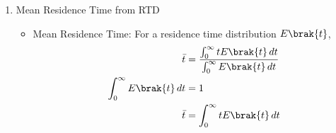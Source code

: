 \begin{enumerate}[label=\thesubsection.\arabic*, ref=\thesubsection.\theenumi,itemsep=0pt]
\begin{itemize}
\solution
Expand the product:
\begin{align}
z_1z_2
&=(a+bi)(c+di)\\
&=(ac-bd)+i(ad+bc).
\end{align}
Thus the real and imaginary parts are $ac-bd$ and $ad+bc$. Matrix multiplication gives the same components:
\begin{align}
\myvec{ac-bd\\ad+bc}
&=\myvec{a&-b\\b&a}\myvec{c\\d}.
\end{align}
\item Argument from the Dot Product:

Let
\begin{align}
\vec{z}
=
\myvec{
x\\
y
}
\end{align}
represent a nonzero complex number and let
\begin{align}
\hat{i}
=
\myvec{
1\\
0
}
\end{align}
be the unit vector along the positive real axis.

Then
\begin{align}
\cos\theta
&=
\frac{\vec{z}^{\top}\hat{i}}
{\|\vec{z}\|\,\|\hat{i}\|}.
\label{eq:complex_argument_dot_product}
\end{align}

The signs of $x$ and $y$ determine the quadrant of the resultant vector.


\solution
The dot-product identity is $\vec{u}^{\top}\vec{v}=\|\vec{u}\|\|\vec{v}\|\cos\theta$. Taking $\vec{u}=\vec{z}$ and $\vec{v}=\hat{i}$ and rearranging gives
\begin{align}
\cos\theta
&=\frac{\vec{z}^{\top}\hat{i}}{\|\vec{z}\|\,\|\hat{i}\|}.
\end{align}
Since $\hat{i}=\myvec{1\\0}$, its norm is $1$ and $\vec{z}^{\top}\hat{i}=x$, so $\cos\theta=x/\sqrt{x^2+y^2}$. The signs of $x$ and $y$ identify the quadrant.
\end{itemize}

\item Mean Residence Time from RTD
\begin{itemize}
\item Mean Residence Time:
For a residence time distribution $E\brak{t}$,
\begin{align}
\bar{t}
&= \frac{\int_0^\infty tE\brak{t}\,dt}
{\int_0^\infty E\brak{t}\,dt}
\label{eq:mean_rtd_ratio}\\
\int_0^\infty E\brak{t}\,dt
&= 1
\label{eq:rtd_normalization}\\
\bar{t}
&= \int_0^\infty tE\brak{t}\,dt
\label{eq:mean_rtd_integral}
\end{align}


\end{itemize}
\end{enumerate}
